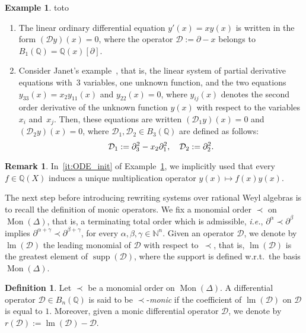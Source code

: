 \documentclass[11pt]{article}
\theoremstyle{definition}
\newtheorem{definition}[theorem]{Definition}
\newtheorem{remark}[theorem]{Remark}
\newtheorem{example}[theorem]{Example}
\newcommand\ie{\emph{i.e.}}
\newcommand\D{\mathcal{D}}
\DeclareMathOperator{\supp}{supp}
\DeclareMathOperator{\lm}{lm}
\newcommand\Q{\mathbb{Q}}
\newcommand\N{\mathbb{N}}
\newcommand\Weyl[1]{B_{#1}(\Q)}
\newcommand\monBasis{\Mon(\Delta)}
\DeclareMathOperator{\Mon}{Mon}
\begin{document}
\begin{example}\label{ex:diff_operators_init}
  {\color{white}toto}
  \begin{enumerate}
  \item\label{it:ODE_init} The linear ordinary differential equation
    $y'(x)=xy(x)$ is written in the form $(\D y)(x)=0$, where the operator
    $\D:=\partial-x$ belongs to $\Weyl{1}=\Q(x)[\partial]$. 
  \item\label{it:Janet_example_init} Consider Janet's
    example~\cite{MR1308976}, that is, the linear system of partial
    derivative equations with~$3$ variables, one unknown function, and
    the two equations $y_{33}(x)=x_2y_{11}(x)$ and $y_{22}(x)=0$, where
    $y_{ij}(x)$ denotes the second order derivative of the unknown
    function $y(x)$ with respect to the variables $x_i$ and~$x_j$. Then,
    these equations are written $(\D_1y)(x)=0$ and $(\D_2y)(x)=0$, where
    $\D_1,\D_2\in\Weyl{3}$ are defined as follows:
    \[\D_1:=\partial_3^2-x_2\partial_1^2,\quad \D_2:=\partial_2^2.
    \smallskip\]
  \end{enumerate}
\end{example}

\begin{remark}
  In~\ref{it:ODE_init} of Example~\ref{ex:diff_operators_init}, we
  implicitly used that every $f\in\Q(X)$ induces a unique multiplication
  operator $y(x)\mapsto f(x)y(x)$.
\end{remark}
\smallskip

The next step before introducing rewriting systems over rational Weyl
algebras is to recall the definition of monic operators. We fix a
monomial order $\prec$ on $\monBasis$, that is, a terminating total 
order which is admissible, \ie, $\partial^{\alpha}\prec\partial^{\beta}$
implies $\partial^{\alpha+\gamma}\prec\partial^{\beta+\gamma}$, for every
$\alpha,\beta,\gamma\in\N^n$. Given an operator $\D$, we denote by
$\lm(\D)$ the leading monomial of $\D$ with respect to~$\prec$, that 
is, $\lm(\D)$ is the greatest element of $\supp(\D)$, where the support 
is defined w.r.t.\ the basis $\monBasis$. 
\smallskip

\begin{definition}
  Let $\prec$ be a monomial order on $\monBasis$. A differential
  operator $\D\in\Weyl{n}$ is said to be $\prec$-{\em monic} if the
  coefficient of $\lm(\D)$ on $\D$ is equal to $1$. Moreover, given a
  monic differential operator $\D$, we denote by $r(\D):=\lm(\D)-\D$.
\end{definition}
\smallskip
\end{document}
